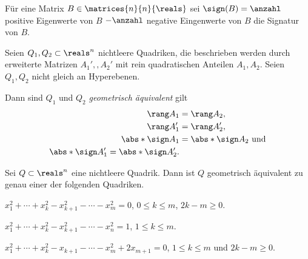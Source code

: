 Für eine Matrix \( B\in \matrices{n}{n}{\reals} \) sei \( \sign(B)=\anzahl \) positive Eigenwerte von \( B \) \( -\anzahl \) negative Eingenwerte von \( B \) die Signatur von \( B \).
\begin{satz}
  Seien \( Q_1,Q_2\subset \reals^n \) nichtleere Quadriken, die beschrieben werden durch erweiterte Matrizen \( A_1',,A_2' \) mit rein quadratischen Anteilen \( A_1,A_2 \). Seien \( Q_1,Q_2 \) nicht gleich an Hyperebenen.

  Dann sind \( Q_1 \) und \( Q_2 \) \emph{geometrisch äquivalent} \gdw gilt
\begin{align*}
  \rang A_1&=\rang A_2,\\
  \rang A_1'&=\rang A_2',\\
  \abs*{\sign A_1}&=\abs*{\sign A_2}\text{ und}\\
  \abs*{\sign A_1'}=\abs*{\sign A_2'}.
\end{align*}
\end{satz}
\begin{folgerung}
  Sei \( Q\subset \reals^n \) eine nichtleere Quadrik. Dann ist \( Q \) geometrisch äquivalent zu genau einer der folgenden Quadriken.
  \begin{eigenschaftenenumerate}
    \item \label{quadriken_gleich_null_nur_quadrate}\( x_1^2+\dotsb+x_k^2-x_{k+1}^2-\dotsb-x_m^2=0 \), \( 0\leq k\leq m \), \( 2k-m\geq 0 \).
    \item \label{quadriken_gleich_eins}\( x_1^2+\dotsb+x_k^2-x_{k+1}^2-\dotsb-x_n^2=1 \), \( 1\leq k\leq m \).
    \item \label{qadriken_gleich_null_plus_ein_linearer}\( x_1^2+\dotsb+x_k^2-x_{k+1}-\dotsb-x_m^2+2x_{m+1}=0 \), \( 1\leq k\leq m \) und \( 2k-m\geq 0 \).
  \end{eigenschaftenenumerate}
\end{folgerung}
